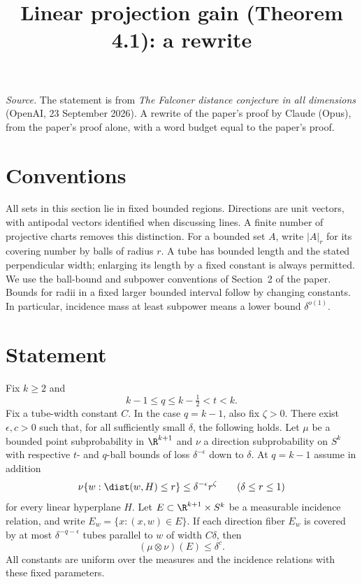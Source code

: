 \documentclass[11pt,reqno]{amsart}
\title{Linear projection gain (Theorem 4.1): a rewrite}
\begin{document}
\maketitle
\noindent\emph{Source.} The statement is from \emph{The Falconer distance conjecture in all dimensions} (OpenAI, 23 September 2026). A rewrite of the paper's proof by Claude (Opus), from the paper's proof alone, with a word budget equal to the paper's proof.

\section*{Conventions}
All sets in this section lie in fixed bounded regions. Directions are unit
vectors, with antipodal vectors identified when discussing lines. A finite
number of projective charts removes this distinction. For a bounded set
$A$, write $|A|_r$ for its covering number by balls of radius $r$. A tube has
bounded length and the stated perpendicular width; enlarging its length by
a fixed constant is always permitted. We use the ball-bound and subpower
conventions of Section~2 of the paper. Bounds for radii in a fixed
larger bounded interval follow by changing constants. In particular,
incidence mass at least subpower means a lower bound $\delta^{o(1)}$.

\section*{Statement}
\begin{theorem}\label{ang:linear-gain}
Fix $k\ge2$ and
\[
 k-1\le q\le k-\tfrac12<t<k.
\]
Fix a tube-width constant $C$. In the case $q=k-1$, also fix
$\zeta>0$. There exist $\epsilon,c>0$ such that, for all sufficiently
small $\delta$, the following holds. Let $\mu$ be a bounded point
subprobability in $\R^{k+1}$ and $\nu$ a direction subprobability on $S^k$
with respective $t$- and $q$-ball bounds of loss $\delta^{-\epsilon}$
down to $\delta$. At $q=k-1$ assume in addition
\begin{equation}\label{ang:endpoint-plate}
 \nu\{w:\dist(w,H)\le r\}\le\delta^{-\epsilon}r^\zeta
       \qquad(\delta\le r\le1)
\end{equation}
for every linear hyperplane $H$. Let $E\subset\R^{k+1}\times S^k$ be a
measurable incidence relation, and write $E_w=\{x:(x,w)\in E\}$.
If each direction fiber $E_w$ is covered by at most
$\delta^{-q-\epsilon}$ tubes parallel to $w$ of width $C\delta$, then
\[
 (\mu\otimes\nu)(E)\le\delta^c.
\]
All constants are uniform over the measures and the incidence relations
with these fixed parameters.
\end{theorem}
\end{document}
